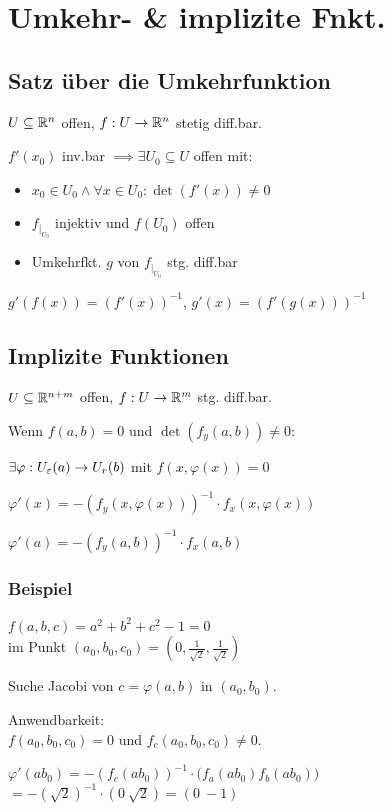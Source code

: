 \section*{Umkehr- \& implizite Fnkt.}

\subsection*{Satz über die Umkehrfunktion}
$U\subseteq\mathbb{R}^n$ offen, $f:U\to\mathbb{R}^n$ stetig diff.bar.

$f'(x_0)$ inv.bar $\implies \exists U_0 \subseteq U$ offen mit:
\begin{itemize}
	\item $x_0\in U_0 \land \forall x\in U_0: \det(f'(x)) \neq 0$
	\item $f_{\mid_{U_0}}$ injektiv und $f(U_0)$ offen
	\item Umkehrfkt. $g$ von $f_{\mid_{U_0}}$ stg. diff.bar
\end{itemize}
$g'(f(x))=(f'(x))^{-1}$, $g'(x) = (f'(g(x)))^{-1}$

\subsection*{Implizite Funktionen}
$U \subseteq \mathbb{R}^{n+m}$ offen, $f: U \to \mathbb{R}^m$ stg. diff.bar.

Wenn $f(a,b)=0$ und $\det(f_y(a,b)) \neq 0$:

$\exists \varphi:U_\varepsilon(a) \to U_r(b)$ mit $f(x,\varphi(x))=0$

$\varphi'(x)=-(f_y(x,\varphi(x)))^{-1} \cdot f_x(x,\varphi(x))$

$\varphi'(a) = -(f_y(a,b))^{-1} \cdot f_x(a,b)$

\subsubsection*{Beispiel}
$f(a,b,c)=a^2+b^2+c^2-1=0$ \\
im Punkt $(a_0,b_0,c_0) = (0, \frac{1}{\sqrt{2}}, \frac{1}{\sqrt{2}})$

Suche Jacobi von $c=\varphi(a,b)$ in $(a_0,b_0)$.

Anwendbarkeit: \\
$f(a_0,b_0,c_0)=0$ und $f_c(a_0,b_0,c_0) \neq 0$.

$\varphi'(ab_0)=-(f_c(ab_0))^{-1} \cdot \big(f_a(ab_0) f_b(ab_0)\big)$ \\
$= - (\sqrt{2})^{-1} \cdot (0 ~ \sqrt{2}) = (0 ~ -1)$
